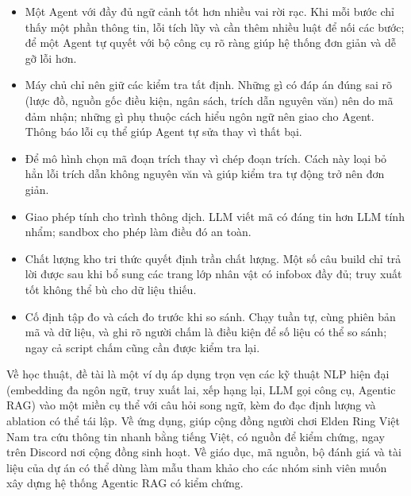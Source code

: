 \begin{itemize}
    \item Một Agent với đầy đủ ngữ cảnh tốt hơn nhiều vai rời rạc. Khi mỗi bước chỉ thấy một phần thông tin, lỗi tích lũy và cần thêm nhiều luật để nối các bước; để một Agent tự quyết với bộ công cụ rõ ràng giúp hệ thống đơn giản và dễ gỡ lỗi hơn.
    \item Máy chủ chỉ nên giữ các kiểm tra tất định. Những gì có đáp án đúng sai rõ (lược đồ, nguồn gốc điều kiện, ngân sách, trích dẫn nguyên văn) nên do mã đảm nhận; những gì phụ thuộc cách hiểu ngôn ngữ nên giao cho Agent. Thông báo lỗi cụ thể giúp Agent tự sửa thay vì thất bại.
    \item Để mô hình chọn mã đoạn trích thay vì chép đoạn trích. Cách này loại bỏ hẳn lỗi trích dẫn không nguyên văn và giúp kiểm tra tự động trở nên đơn giản.
    \item Giao phép tính cho trình thông dịch. LLM viết mã có  đáng tin hơn LLM tính nhẩm; sandbox cho phép làm điều đó an toàn.
    \item Chất lượng kho tri thức quyết định trần chất lượng. Một số câu build chỉ trả lời được sau khi bổ sung các trang lớp nhân vật có infobox đầy đủ; truy xuất tốt không thể bù cho dữ liệu thiếu.
    \item Cố định tập đo và cách đo trước khi so sánh. Chạy tuần tự, cùng phiên bản mã và dữ liệu, và ghi rõ người chấm là điều kiện để số liệu có thể so sánh; ngay cả script chấm cũng cần được kiểm tra lại.
\end{itemize}


Về học thuật, đề tài là một ví dụ áp dụng trọn vẹn các kỹ thuật NLP hiện đại (embedding đa ngôn ngữ, truy xuất lai, xếp hạng lại, LLM gọi công cụ, Agentic RAG) vào một miền cụ thể với câu hỏi song ngữ, kèm đo đạc định lượng và ablation có thể tái lập. Về ứng dụng, \IB{} giúp cộng đồng người chơi Elden Ring Việt Nam tra cứu thông tin nhanh bằng tiếng Việt, có nguồn để kiểm chứng, ngay trên Discord nơi cộng đồng sinh hoạt. Về giáo dục, mã nguồn, bộ đánh giá và tài liệu của dự án có thể dùng làm mẫu tham khảo cho các nhóm sinh viên muốn xây dựng hệ thống Agentic RAG có kiểm chứng.


